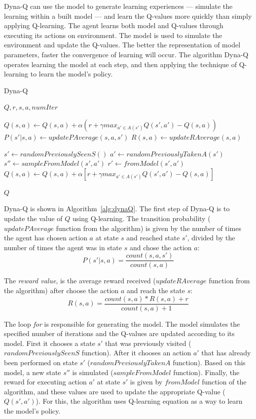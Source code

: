 Dyna-Q can use the model to generate learning experiences --- simulate the learning within a built model --- and learn the Q-values more quickly than simply applying Q-learning.
The agent learns both model and Q-values through executing its actions on environment.
The model is used to simulate the environment and update the Q-values.
The better the representation of model parameters, faster the convergence of learning will occur.
The algorithm Dyna-Q operates learning the model at each step, and then applying the technique of Q-learning to learn the model's policy.

\begin{algorithm}
	\caption{Dyna-Q}
	\label{alg:dynaQ}
	\begin{algorithmic}[1]
		\REQUIRE $Q, r, s, a, numIter$
		\item[]
		\STATE $Q(s,a) \gets Q(s,a) + \alpha(r + \gamma max_{a' \in A(s')}Q(s',a') - Q(s,a))$
		\STATE $P(s'|s,a) \gets updatePAverage(s,a,s')$
		\STATE $R(s,a) \gets updateRAverage(s,a)$
		\item[]
        	\STATE $s' \gets randomPreviouslySeenS()$
        	\STATE $a' \gets randomPreviouslyTakenA(s')$
        	\STATE $s'' \gets sampleFromModel(s',a')$
        	\STATE $r' \gets fromModel(s',a')$
        	\STATE $Q(s,a) \leftarrow Q(s,a) + \alpha[r + \gamma max_{a' \in A(s')}Q(s',a') - Q(s,a)]$
		\ENDFOR
		\item[]
		\RETURN $Q$
	\end{algorithmic}
\end{algorithm}

Dyna-Q is shown in Algorithm~\ref{alg:dynaQ}. The first step of Dyna-Q is to update the value of $Q$ using Q-learning.
The transition probability ($updatePAverage$ function from the algorithm) is given by the number of times the agent has chosen action $a$ at state $s$ and reached state $s'$, divided by the number of times the agent was in state $s$ and chose the action $a$:
\[ P(s'|s,a) = \frac{count(s,a,s')}{count(s,a)} \]

The \textit{reward value}, is the average reward received ($updateRAverage$ function from the algorithm) after choose the action $a$ and reach the state $s$:
\[ R(s,a) = \frac{count(s,a) * R(s,a) + r}{count(s,a) + 1} \]

The loop \textit{for} is responsible for generating the model.
The model simulates the specified number of iterations and the Q-values are updated according to its model.
First it chooses a state $s'$ that was previously visited ($randomPreviouslySeenS$ function).
After it chooses an action $a'$ that has already been performed on state $s'$ ($randomPreviouslyTakenA$ function).
Based on this model, a new state $s''$ is simulated ($sampleFromModel$ function).
Finally, the reward for executing action $a'$ at state $s'$ is given by $fromModel$ function of the algorithm, and these values are used to update the appropriate Q-value ($Q(s',a')$).
For this, the algorithm uses Q-learning equation as a way to learn the model's policy.



